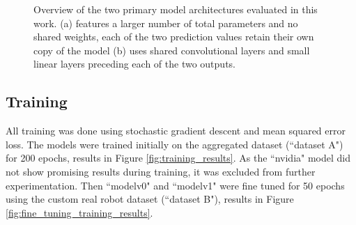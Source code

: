 \documentclass{article}
\begin{document}
\begin{figure}
\centering
    \caption{Overview of the two primary model architectures evaluated in this work. (a) features a larger number of total parameters and no shared weights, each of the two prediction values retain their own copy of the model (b) uses shared convolutional layers and small linear layers preceding each of the two outputs.}
\label{fig:model_arch}
\end{figure}

\subsection{Training}
All training was done using stochastic gradient descent and mean squared error loss. The models were trained initially on the aggregated dataset (``dataset A") for 200 epochs, results in Figure \ref{fig:training_results}. As the ``nvidia" model did not show promising results during training, it was excluded from further experimentation. Then ``modelv0" and ``modelv1" were fine tuned for 50 epochs using the custom real robot dataset (``dataset B"), results in Figure \ref{fig:fine_tuning_training_results}.
\end{document}
